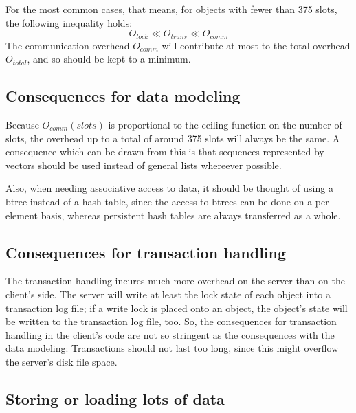 %
For the most common cases, that means, for objects with fewer than 375
slots, the following inequality holds:
%
\begin{displaymath}
O_{lock} \ll O_{trans} \ll O_{comm}
\end{displaymath}
%
The communication overhead $O_{comm}$ will contribute at most to the
total overhead $O_{total}$, and so should be kept to a minimum.
%
\subsection{Consequences for data modeling}%
\label{sec:DataModeling}

Because $O_{comm}(slots)$ is proportional to the ceiling function on the
number of slots, the overhead up to a total of around 375 slots will
always be the same. A consequence which can be drawn from this is that
sequences represented by vectors should be used instead of general
lists whereever possible.

Also, when needing associative access to data, it should be thought of
using a btree instead of a hash table, since the access to btrees can
be done on a per-element basis, whereas persistent hash tables are
always transferred as a whole.

\subsection{Consequences for transaction handling}

The transaction handling incures much more overhead on the server than
on the client's side. The server will write at least the lock state of
each object into a transaction log file; if a write lock is placed
onto an object, the object's state will be written to the transaction
log file, too. So, the consequences for transaction handling in the
client's code are not so stringent as the consequences with the data
modeling: Transactions should not last too long, since this might
overflow the server's disk file space.

\subsection{Storing or loading lots of data}%
\label{sec:LotsOfData}

